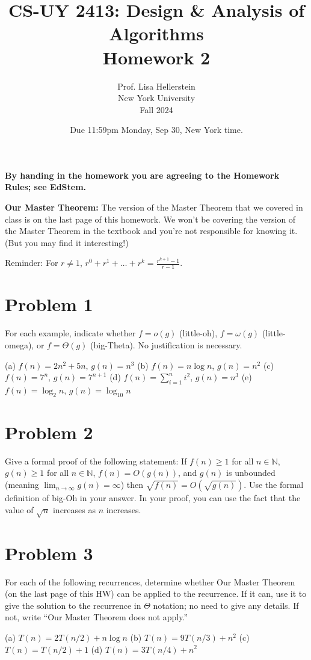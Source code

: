 \documentclass{article}
\title{CS-UY 2413: Design \& Analysis of Algorithms \\ Homework 2}
\author{Prof. Lisa Hellerstein \\ New York University \\ Fall 2024}
\date{Due 11:59pm Monday, Sep 30, New York time.}
\begin{document}
\maketitle

\textbf{By handing in the homework you are agreeing to the Homework Rules; see EdStem.}

\textbf{Our Master Theorem:} The version of the Master Theorem that we covered in class is on the last page of this homework. We won’t be covering the version of the Master Theorem in the textbook and you’re not responsible for knowing it. (But you may find it interesting!)

Reminder: For $r \neq 1$, $r^0 + r^1 + \dots + r^k = \frac{r^{k+1} - 1}{r - 1}$.

\section*{Problem 1}
For each example, indicate whether $f = o(g)$ (little-oh), $f = \omega(g)$ (little-omega), or $f = \Theta(g)$ (big-Theta). No justification is necessary.

(a) $f(n) = 2n^2 + 5n$, $g(n) = n^3$
(b) $f(n) = n \log n$, $g(n) = n^2$
(c) $f(n) = 7^n$, $g(n) = 7^{n+1}$
(d) $f(n) = \sum_{i=1}^n i^2$, $g(n) = n^3$
(e) $f(n) = \log_2 n$, $g(n) = \log_{10} n$

\section*{Problem 2}
Give a formal proof of the following statement: If $f(n) \ge 1$ for all $n \in \mathbb{N}$, $g(n) \ge 1$ for all $n \in \mathbb{N}$, $f(n) = O(g(n))$, and $g(n)$ is unbounded (meaning $\lim_{n \to \infty} g(n) = \infty$) then $\sqrt{f(n)} = O(\sqrt{g(n)})$.
Use the formal definition of big-Oh in your answer. In your proof, you can use the fact that the value of $\sqrt{n}$ increases as $n$ increases.


\section*{Problem 3}
For each of the following recurrences, determine whether Our Master Theorem (on the last page of this HW) can be applied to the recurrence. If it can, use it to give the solution to the recurrence in $\Theta$ notation; no need to give any details. If not, write “Our Master Theorem does not apply.”

(a) $T(n) = 2T(n/2) + n \log n$
(b) $T(n) = 9T(n/3) + n^2$
(c) $T(n) = T(n/2) + 1$
(d) $T(n) = 3T(n/4) + n^2$
\end{document}
